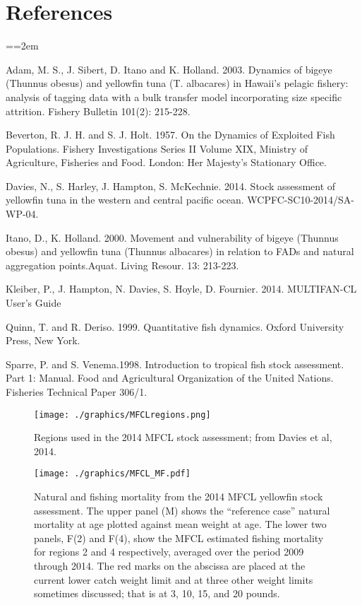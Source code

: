 \documentclass[12pt,letterpaper]{article}
\newcommand\doublespacing{\baselineskip=1.6\normalbaselineskip}
\begin{document}
\section*{References}
{\parindent=0cm \small
\everypar={\hangindent=2em }\par
\doublespacing
Adam, M. S., J. Sibert, D. Itano and K. Holland. 2003. Dynamics of
bigeye (Thunnus obesus) and yellowfin tuna (T. albacares) in Hawaii's
pelagic fishery: analysis of tagging data with a bulk transfer model
incorporating size specific attrition. Fishery Bulletin 101(2):
215-228.

Beverton, R. J. H. and S. J. Holt. 1957. On the Dynamics of Exploited
Fish Populations. Fishery Investigations Series II Volume XIX,
Ministry of Agriculture, Fisheries and Food. London: Her Majesty's
Stationary Office.

Davies, N., S. Harley, J. Hampton, S. McKechnie. 2014. Stock
assessment of yellowfin tuna in the western and central pacific ocean.
WCPFC-SC10-2014/SA-WP-04.

Itano, D., K. Holland. 2000.  Movement and vulnerability of bigeye
(Thunnus obesus) and yellowfin tuna (Thunnus albacares) in relation to
FADs and natural aggregation points.Aquat. Living Resour. 13: 213-223.

Kleiber, P., J. Hampton, N. Davies, S. Hoyle, D. Fournier. 2014.
MULTIFAN-CL User’s Guide

Quinn, T. and R. Deriso. 1999. Quantitative fish dynamics. Oxford
University Press, New York.

Sparre, P. and S. Venema.1998. Introduction to tropical fish stock
assessment. Part 1: Manual. Food and Agricultural Organization of the
United Nations. Fisheries Technical Paper 306/1.
\par}

\begin{figure}
\begin{center}
\texttt{[image: ./graphics/MFCLregions.png]}
\caption{\label{fig:mfclreg}
Regions used in the 2014 MFCL stock assessment; from Davies et al,
2014.
}
\end{center}
\end{figure}

\begin{figure}
\begin{center}
\texttt{[image: ./graphics/MFCL\_MF.pdf]}
\caption{\label{fig:mfclmf}
Natural and fishing mortality from the 2014 MFCL yellowfin stock
assessment. The upper panel (M) shows the ``reference case'' natural
mortality at age plotted against mean weight at age.
The lower two panels, F(2) and F(4), show the MFCL estimated fishing
mortality for regions 2 and 4 respectively, averaged over the period
2009 through 2014.
The red marks on the abscissa are placed at
the current lower catch weight limit and at three other
weight limits sometimes discussed; 
that is at 3, 10, 15, and 20 pounds.
}
\end{center}
\end{figure}
\end{document}
